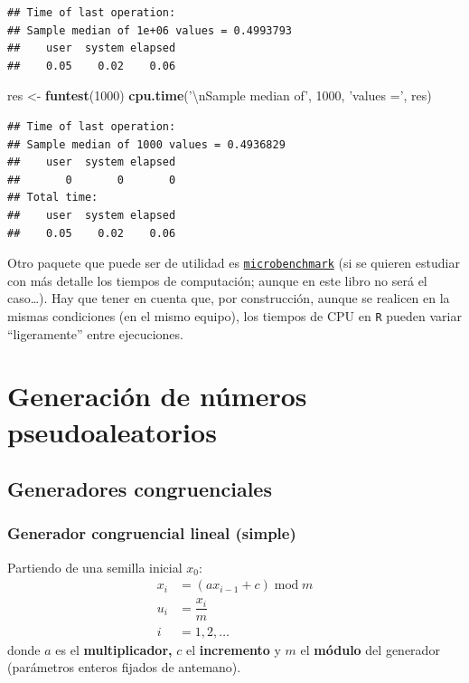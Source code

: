 \documentclass[]{book}
\newenvironment{Shaded}{\begin{snugshade}}{\end{snugshade}}
\newcommand{\KeywordTok}[1]{\textcolor[rgb]{0.13,0.29,0.53}{\textbf{#1}}}
\newcommand{\DecValTok}[1]{\textcolor[rgb]{0.00,0.00,0.81}{#1}}
\newcommand{\CharTok}[1]{\textcolor[rgb]{0.31,0.60,0.02}{#1}}
\newcommand{\StringTok}[1]{\textcolor[rgb]{0.31,0.60,0.02}{#1}}
\newcommand{\NormalTok}[1]{#1}
\theoremstyle{definition}
\theoremstyle{definition}
\theoremstyle{definition}
\theoremstyle{remark}
\begin{document}
\begin{verbatim}
## Time of last operation: 
## Sample median of 1e+06 values = 0.4993793 
##    user  system elapsed 
##    0.05    0.02    0.06
\end{verbatim}

\begin{Shaded}
\begin{Highlighting}[]
\NormalTok{res <-}\StringTok{ }\KeywordTok{funtest}\NormalTok{(}\DecValTok{1000}\NormalTok{)}
\KeywordTok{cpu.time}\NormalTok{(}\StringTok{'}\CharTok{\textbackslash{}n}\StringTok{Sample median of'}\NormalTok{, }\DecValTok{1000}\NormalTok{, }\StringTok{'values ='}\NormalTok{, res)}
\end{Highlighting}
\end{Shaded}

\begin{verbatim}
## Time of last operation: 
## Sample median of 1000 values = 0.4936829 
##    user  system elapsed 
##       0       0       0 
## Total time:
##    user  system elapsed 
##    0.05    0.02    0.06
\end{verbatim}

Otro paquete que puede ser de utilidad es
\href{https://CRAN.R-project.org/package=microbenchmark}{\texttt{microbenchmark}}
(si se quieren estudiar con más detalle los tiempos de computación;
aunque en este libro no será el caso\ldots{}). Hay que tener en cuenta
que, por construcción, aunque se realicen en la mismas condiciones (en
el mismo equipo), los tiempos de CPU en \texttt{R} pueden variar
``ligeramente'' entre ejecuciones.

\chapter{Generación de números
pseudoaleatorios}\label{generacion-de-numeros-pseudoaleatorios-1}

\hypertarget{generadores-congruenciales}{\section{Generadores
congruenciales}\label{generadores-congruenciales}}

\subsection{Generador congruencial lineal (simple)}\label{conlinsim}

Partiendo de una semilla inicial \(x_{0}\): \[\begin{aligned}
x_{i}  & = (ax_{i-1}+c) \operatorname{mod} m \\
u_{i}  & = \dfrac{x_{i}}{m} \\
i  & =1,2,\ldots
\end{aligned}\] donde \(a\) es el \textbf{multiplicador,} \(c\) el
\textbf{incremento} y \(m\) el \textbf{módulo} del generador (parámetros
enteros fijados de antemano).
\end{document}
